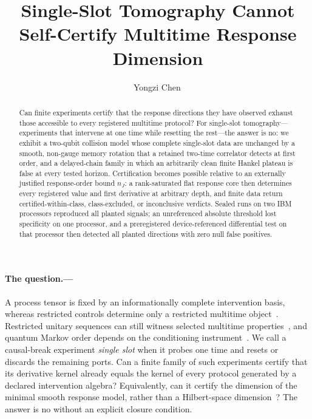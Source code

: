 \documentclass[aps,prl,reprint,superscriptaddress,nofootinbib]{revtex4-2}
\begin{document}
\title{Single-Slot Tomography Cannot Self-Certify Multitime Response Dimension}
\author{Yongzi Chen\,}

\begin{abstract}
Can finite experiments certify that the response directions they have observed exhaust those accessible to every registered multitime protocol?  For single-slot tomography---experiments that intervene at one time while resetting the rest---the answer is no: we exhibit a two-qubit collision model whose complete single-slot data are unchanged by a smooth, non-gauge memory rotation that a retained two-time correlator detects at first order, and a delayed-chain family in which an arbitrarily clean finite Hankel plateau is false at every tested horizon.  Certification becomes possible relative to an externally justified response-order bound $n_J$: a rank-saturated flat response core then determines every registered value and first derivative at arbitrary depth, and finite data return certified-within-class, class-excluded, or inconclusive verdicts.  Sealed runs on two IBM processors reproduced all planted signals; an unreferenced absolute threshold lost specificity on one processor, and a preregistered device-referenced differential test on that processor then detected all planted directions with zero null false positives.
\end{abstract}
\maketitle

\paragraph{The question.---}
A process tensor is fixed by an informationally complete intervention basis, whereas restricted controls determine only a restricted multitime object~\cite{Pollock2018ProcessTensor,White2020ProcessControl,White2022ProcessTomography,Giarmatzi2025Multitime}.  Restricted unitary sequences can still witness selected multitime properties~\cite{White2025UnitarySequences}, and quantum Markov order depends on the conditioning instrument~\cite{Taranto2019MarkovOrder}.  We call a causal-break experiment \emph{single slot} when it probes one time and resets or discards the remaining ports.  Can a finite family of such experiments certify that its derivative kernel already equals the kernel of every protocol generated by a declared intervention algebra?  Equivalently, can it certify the dimension of the minimal smooth response model, rather than a Hilbert-space dimension~\cite{Brunner2008,Gallego2010}?  The answer is no without an explicit closure condition.
\end{document}
